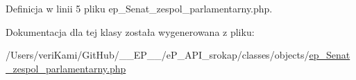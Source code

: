Definicja w linii 5 pliku ep\-\_\-\-Senat\-\_\-zespol\-\_\-parlamentarny.\-php.



Dokumentacja dla tej klasy została wygenerowana z pliku\-:\begin{DoxyCompactItemize}
\item 
/\-Users/veri\-Kami/\-Git\-Hub/\-\_\-\-\_\-\-E\-P\-\_\-\-\_\-/e\-P\-\_\-\-A\-P\-I\-\_\-srokap/classes/objects/\hyperlink{ep___senat__zespol__parlamentarny_8php}{ep\-\_\-\-Senat\-\_\-zespol\-\_\-parlamentarny.\-php}\end{DoxyCompactItemize}
